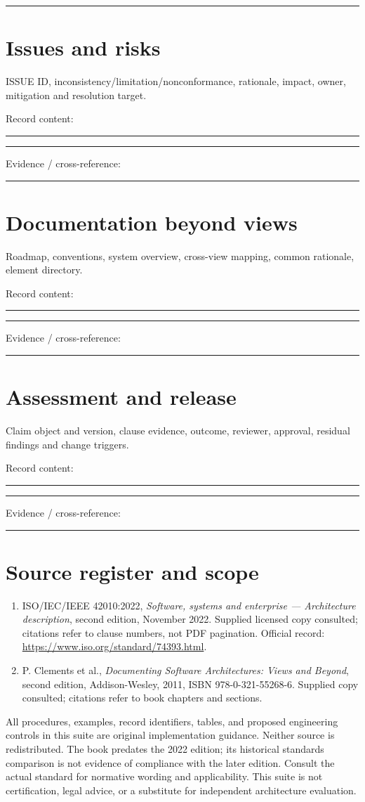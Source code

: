 \documentclass[11pt,letterpaper]{article}
\newcommand{\docsection}[1]{\Needspace{5\baselineskip}\section{#1}}
\begin{document}
\noindent\rule{\linewidth}{0.35pt}\par
\docsection{Issues and risks}
ISSUE ID, inconsistency/limitation/nonconformance, rationale, impact, owner, mitigation and resolution target.

Record content:

\noindent\rule{\linewidth}{0.35pt}\par\vspace{0.7em}
\noindent\rule{\linewidth}{0.35pt}\par\vspace{0.7em}
Evidence / cross-reference:

\noindent\rule{\linewidth}{0.35pt}\par
\docsection{Documentation beyond views}
Roadmap, conventions, system overview, cross-view mapping, common rationale, element directory.

Record content:

\noindent\rule{\linewidth}{0.35pt}\par\vspace{0.7em}
\noindent\rule{\linewidth}{0.35pt}\par\vspace{0.7em}
Evidence / cross-reference:

\noindent\rule{\linewidth}{0.35pt}\par
\docsection{Assessment and release}
Claim object and version, clause evidence, outcome, reviewer, approval, residual findings and change triggers.

Record content:

\noindent\rule{\linewidth}{0.35pt}\par\vspace{0.7em}
\noindent\rule{\linewidth}{0.35pt}\par\vspace{0.7em}
Evidence / cross-reference:

\noindent\rule{\linewidth}{0.35pt}\par
\docsection{Source register and scope}
\begin{enumerate}
\item ISO/IEC/IEEE 42010:2022, \emph{Software, systems and enterprise --- Architecture description}, second edition, November 2022. Supplied licensed copy consulted; citations refer to clause numbers, not PDF pagination. Official record: \url{https://www.iso.org/standard/74393.html}.
\item P. Clements et al., \emph{Documenting Software Architectures: Views and Beyond}, second edition, Addison-Wesley, 2011, ISBN 978-0-321-55268-6. Supplied copy consulted; citations refer to book chapters and sections.
\end{enumerate}
All procedures, examples, record identifiers, tables, and proposed engineering controls in this suite are original implementation guidance. Neither source is redistributed. The book predates the 2022 edition; its historical standards comparison is not evidence of compliance with the later edition. Consult the actual standard for normative wording and applicability. This suite is not certification, legal advice, or a substitute for independent architecture evaluation.
\end{document}
